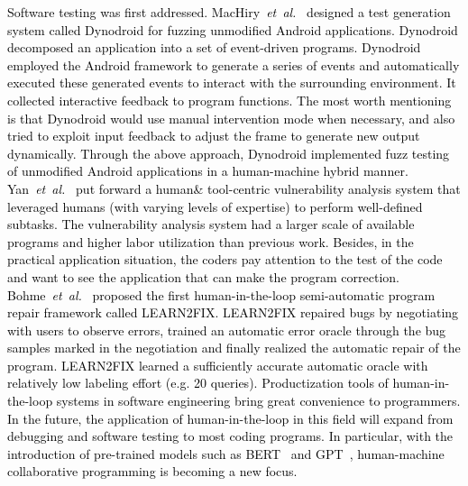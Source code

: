 \documentclass{article}
\newcommand\etal{\emph{et~al.}}
\newcommand{\p}[1]{\textcolor{black}{#1}}
\newcommand{\REO}[1]{\textcolor{black}{#1}}
\begin{document}
\REO{
Software testing was first addressed. MacHiry~\etal~\cite{machiry2013dynodroid} \p{designed} a test generation system called Dynodroid for fuzzing unmodified Android applications.
Dynodroid decomposed an application into a set of event-driven programs.
Dynodroid \p{employed} the Android framework to generate a series of events and automatically executed these generated events to interact with the surrounding environment. It collected interactive feedback to program functions. The most worth mentioning is that \p{Dynodroid would use manual intervention mode when necessary, and also tried to exploit input feedback to adjust the frame to generate new output dynamically.}
Through the above approach, Dynodroid implemented fuzz testing of unmodified Android applications in a human-machine \p{hybrid manner}.
Yan~\etal~\cite{shoshitaishvili2017rise} \p{put forward} a human\& tool-centric vulnerability analysis system that leveraged humans (with varying levels of expertise) to perform well-defined subtasks. \p{The vulnerability analysis system had a larger scale of available programs and higher labor utilization than previous work.}
Besides, in the practical application situation, the coders pay attention to the test of the code and want to see the application that can make the program correction.
Bohme~\etal~\cite{bohme2020human} proposed the first \REO{human-in-the-loop} semi-automatic program repair framework called LEARN2FIX.
LEARN2FIX repaired bugs by negotiating with users to observe errors, trained an automatic error oracle through the bug samples marked in the negotiation and finally realized the automatic repair of the program. LEARN2FIX learned a sufficiently accurate automatic oracle with \p{relatively}  low labeling effort (e.g. 20 queries).
Productization tools of \REO{human-in-the-loop} systems in software engineering bring great convenience to programmers. In the future, the application of \REO{human-in-the-loop} in this field will expand from debugging and software testing to most coding programs. In particular, with the introduction of pre-trained models such as BERT~\cite{devlin2018bert} and GPT~\cite{radford2018improving}, human-machine collaborative programming is becoming a new focus.}
\end{document}
